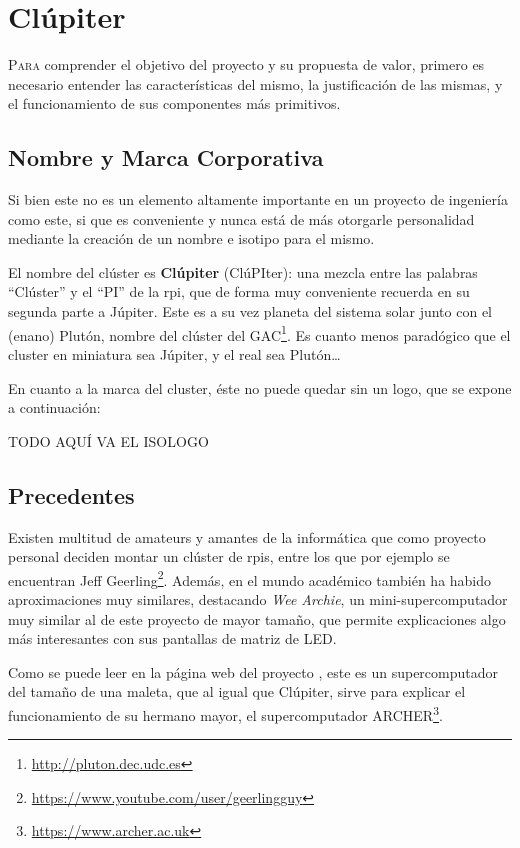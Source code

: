 \chapter{Clúpiter}
\label{chap:conceptos_basicos}

\lettrine{P}{ara} comprender el objetivo del proyecto y su propuesta de valor, primero es necesario entender las características del mismo, la justificación de las mismas, y el funcionamiento de sus componentes más primitivos.

\section{Nombre y Marca Corporativa}
Si bien este no es un elemento altamente importante en un proyecto de ingeniería como este, si que es conveniente y nunca está de más otorgarle personalidad mediante la creación de un nombre e isotipo para el mismo.

El nombre del clúster es \textbf{Clúpiter} (ClúPIter): una mezcla entre las palabras ``Clúster'' y el ``PI'' de la \acrlong{rpi}, que de forma muy conveniente recuerda en su segunda parte a Júpiter. Este es a su vez planeta del sistema solar junto con el (enano) Plutón, nombre del clúster del GAC\footnote{\url{http://pluton.dec.udc.es}}. Es cuanto menos paradógico que el cluster en miniatura sea Júpiter, y el real sea Plutón\dots

En cuanto a la marca del cluster, éste no puede quedar sin un logo, que se expone a continuación:

TODO AQUÍ VA EL ISOLOGO %

\section{Precedentes}
Existen multitud de amateurs y amantes de la informática que como proyecto personal deciden montar un clúster de \acrlong{rpi}s, entre los que por ejemplo se encuentran Jeff Geerling\footnote{\url{https://www.youtube.com/user/geerlingguy}}. Además, en el mundo académico también ha habido aproximaciones muy similares, destacando \textit{Wee Archie}, un mini-supercomputador muy similar al de este proyecto de mayor tamaño, que permite explicaciones algo más interesantes con sus pantallas de matriz de LED.

Como se puede leer en la página web del proyecto \cite{wee_archie_webpage}, este es un supercomputador del tamaño de una maleta, que al igual que Clúpiter, sirve para explicar el funcionamiento de su hermano mayor, el supercomputador ARCHER\footnote{\url{https://www.archer.ac.uk}}.

